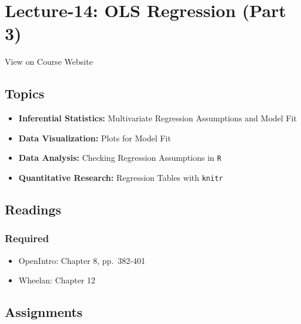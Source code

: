 \documentclass[]{book}
\providecommand{\tightlist}{%
  \setlength{\itemsep}{0pt}\setlength{\parskip}{0pt}}
\theoremstyle{definition}
\theoremstyle{definition}
\theoremstyle{definition}
\theoremstyle{remark}
\begin{document}
\hypertarget{lecture-14-ols-regression-part-3}{%
\section*{Lecture-14: OLS Regression (Part
3)}\label{lecture-14-ols-regression-part-3}}

View on Course Website

\hypertarget{topics-14}{%
\subsection*{Topics}\label{topics-14}}

\begin{itemize}
\tightlist
\item
  \textbf{Inferential Statistics:} Multivariate Regression Assumptions
  and Model Fit
\item
  \textbf{Data Visualization:} Plots for Model Fit
\item
  \textbf{Data Analysis:} Checking Regression Assumptions in \texttt{R}
\item
  \textbf{Quantitative Research:} Regression Tables with \texttt{knitr}
\end{itemize}

\hypertarget{readings-15}{%
\subsection*{Readings}\label{readings-15}}

\hypertarget{required-15}{%
\subsubsection*{Required}\label{required-15}}

\begin{itemize}
\tightlist
\item
  OpenIntro: Chapter 8, pp.~382-401
\item
  Wheelan: Chapter 12
\end{itemize}

\hypertarget{assignments-15}{%
\subsection*{Assignments}\label{assignments-15}}
\end{document}

